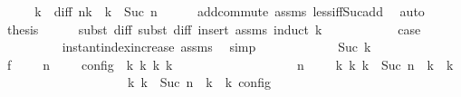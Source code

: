 \begin{isabellebody}
%
\isadelimproof
%
\endisadelimproof
%
\isatagproof
{}\isamarkupfalse%
\ {\isacharminus}\isanewline
\ \ \isamarkupfalse%
\ {\isasymdelta}k\ \ diff{\isacharcolon}\ {\isacartoucheopen}n\isactrlsub k\ {\isacharequal}\ {\isasymdelta}k\ {\isacharplus}\ Suc\ n{\isacartoucheclose}\isanewline
\ \ \ \ \isamarkupfalse%
\ add{\isachardot}commute\ assms{\isacharparenleft}{}{\isacharparenright}\ less{\isacharunderscore}iff{\isacharunderscore}Suc{\isacharunderscore}add\ \isamarkupfalse%
\ auto\isanewline
\ \ \isamarkupfalse%
\ {\isacharquery}thesis\isanewline
\ \ \ \ \isamarkupfalse%
\ {\isacharparenleft}subst\ diff{\isacharcomma}\ subst\ diff{\isacharcomma}\ insert\ assms{\isacharparenleft}{}{\isacharparenright}{\isacharcomma}\ induct\ {\isasymdelta}k{\isacharparenright}\isanewline
\ \ \ \ \ \ \isamarkupfalse%
\ {}\ \ \isamarkupfalse%
\ {\isacharquery}case\isanewline
\ \ \ \ \ \ \ \ \isamarkupfalse%
\ instant{\isacharunderscore}index{\isacharunderscore}increase\ assms{\isacharparenleft}{}{\isacharparenright}\ \isamarkupfalse%
\ simp\isanewline
\ \ \ \ \isamarkupfalse%
\isanewline
\ \ \ \ \ \ \isamarkupfalse%
\ {\isacharparenleft}Suc\ {\isasymdelta}k{\isacharparenright}\isanewline
\ \ \ \ \ \ \ \ \isamarkupfalse%
\ f{}{\isacharcolon}\ {\isacartoucheopen}{\isasymrho}\ {\isasymin}\ {\isasymlbrakk}\ {\isasymGamma}{\isacharcomma}\ n\ {\isasymturnstile}\ {\isasymPsi}\ {\isasymtriangleright}\ {\isasymPhi}\ {\isasymrbrakk}\isactrlsub c\isactrlsub o\isactrlsub n\isactrlsub f\isactrlsub i\isactrlsub g\ {\isasymLongrightarrow}\ {\isasymexists}{\isasymGamma}\isactrlsub k\ {\isasymPsi}\isactrlsub k\ {\isasymPhi}\isactrlsub k\ k{\isachardot}\isanewline
\ \ \ \ \ \ \ \ \ \ \ \ \ \ \ \ \ \ {\isacharparenleft}{\isacharparenleft}{\isasymGamma}{\isacharcomma}\ n\ {\isasymturnstile}\ {\isasymPsi}\ {\isasymtriangleright}\ {\isasymPhi}{\isacharparenright}\ {\isasymhookrightarrow}\isactrlbsup k\isactrlesup \ {\isacharparenleft}{\isasymGamma}\isactrlsub k{\isacharcomma}\ {\isasymdelta}k\ {\isacharplus}\ Suc\ n\ {\isasymturnstile}\ {\isasymPsi}\isactrlsub k\ {\isasymtriangleright}\ {\isasymPhi}\isactrlsub k{\isacharparenright}{\isacharparenright}\isanewline
\ \ \ \ \ \ \ \ \ \ \ \ \ \ \ \ {\isasymand}\ {\isasymrho}\ {\isasymin}\ {\isasymlbrakk}\ {\isasymGamma}\isactrlsub k{\isacharcomma}\ {\isasymdelta}k\ {\isacharplus}\ Suc\ n\ {\isasymturnstile}\ {\isasymPsi}\isactrlsub k\ {\isasymtriangleright}\ {\isasymPhi}\isactrlsub k\ {\isasymrbrakk}\isactrlsub c\isactrlsub o\isactrlsub n\isactrlsub f\isactrlsub i\isactrlsub g{\isacartoucheclose}\isanewline

\end{isabellebody}
